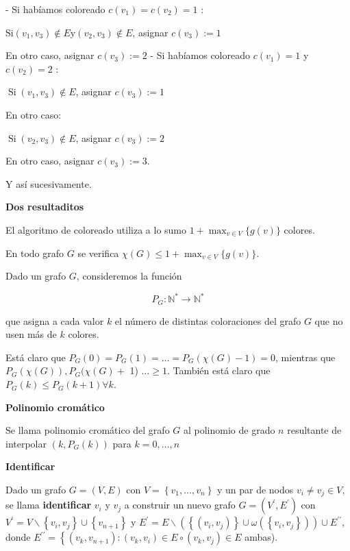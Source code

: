 \documentclass[openany]{book}
\begin{document}
- Si habíamos coloreado $c\left(v_{1}\right)=c\left(v_{2}\right)=1$ :

$\mathrm{Si}\left(v_{1}, v_{3}\right) \notin E \mathrm{y}\left(v_{2}, v_{3}\right) \notin E$, asignar $c\left(v_{3}\right):=1$

En otro caso, asignar $c\left(v_{3}\right):=2$ - Si habíamos coloreado $c\left(v_{1}\right)=1$ y $c\left(v_{2}\right)=2$ :

$\operatorname{Si}\left(v_{1}, v_{3}\right) \notin E$, asignar $c\left(v_{3}\right):=1$

En otro caso:

$\operatorname{Si}\left(v_{2}, v_{3}\right) \notin E$, asignar $c\left(v_{3}\right):=2$

En otro caso, asignar $c\left(v_{3}\right):=3$.

Y así sucesivamente.

\begin{proposition}
  { \color{turquoise} \textbf{Dos resultaditos}}

  El algoritmo de coloreado utiliza a lo sumo $1+\max _{v \in V}\{g(v)\}$ colores.

  En todo grafo $G$ se verifica $\chi(G) \leq 1+\max _{v \in V}\{g(v)\}$.

\end{proposition}

Dado un grafo $G$, consideremos la función

$$
P_{G}: \mathbb{N}^{*} \longrightarrow \mathbb{N}^{*}
$$

que asigna a cada valor $k$ el número de distintas coloraciones del grafo $G$ que no usen más de $k$ colores.

Está claro que $P_{G}(0)=P_{G}(1)=\ldots=P_{G}(\chi(G)-1)=0$, mientras que $P_{G}(\chi(G)), P_{G}(\chi(G)+$ 1) $\ldots \geq 1$. También está claro que $P_{G}(k) \leq P_{G}(k+1) \forall k$.

\begin{definition}
  { \color{turquoise} \textbf{Polinomio cromático}}

  Se llama polinomio cromático del grafo $G$ al polinomio de grado $n$ resultante de interpolar $\left(k, P_{G}(k)\right)$ para $k=0, \ldots, n$
\end{definition}

\begin{definition}
  { \color{turquoise} \textbf{Identificar}}

  Dado un grafo $G=(V, E)$ con $V=\left\{v_{1}, \ldots, v_{n}\right\}$ y un par de nodos $v_{i} \neq v_{j} \in V$, se llama \textbf{identificar} $v_{i}$ y $v_{j}$ a construir un nuevo grafo $G=\left(V^{\prime}, E^{\prime}\right)$ con $V^{\prime}=V \backslash\left\{v_{i}, v_{j}\right\} \cup\left\{v_{n+1}\right\}$ y $E^{\prime}=E \backslash\left(\left\{\left(v_{i}, v_{j}\right)\right\} \cup \omega\left(\left\{v_{i}, v_{j}\right\}\right)\right) \cup E^{\prime \prime}$, donde $E^{\prime \prime}=\left\{\left(v_{k}, v_{n+1}\right):\left(v_{k}, v_{i}\right) \in E \circ\left(v_{k}, v_{j}\right) \in E\right.$ ambas).
\end{definition}
\end{document}
